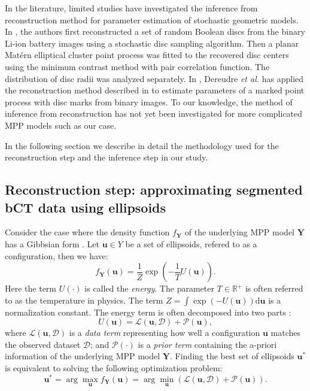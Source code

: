 \documentclass[journal]{IEEEtran}
\newcommand{\dd}[1]{\mathrm{d}#1}%
\begin{document}
In the literature, limited studies have investigated the inference
from reconstruction method for parameter estimation of stochastic
geometric models. In \cite{thiedmann2011stochastic}, the authors first
reconstructed a set of random Boolean discs from the binary Li-ion
battery images using a stochastic disc sampling algorithm. Then a
planar Mat\'ern elliptical cluster point process was fitted to the
recovered disc centers using the minimum contrast method with pair
correlation function. The distribution of disc radii was analyzed
separately. In \cite{dereudre2014estimation}, Dereudre \textit{et al.}
has applied the reconstruction method described in
\cite{thiedmann2011stochastic} to estimate parameters of a marked
point process with disc marks from binary images. To our knowledge,
the method of inference from reconstruction has not yet been
investigated for more complicated MPP models such as our case.

In the following section we describe in detail the methodology used
for the reconstruction step and the inference step in our study.

\subsection{Reconstruction step: approximating segmented bCT data
  using ellipsoids}
\label{sec:reconstr-step:-appr}

Consider the case where the density function $f_{\mathbf{Y}}$ of the
underlying MPP model $\mathbf{Y}$ has a Gibbsian form
\cite{moller2007modern}. Let $\mathbf{u} \in Y$ be a set of
ellipsoids, refered to as a configuration, then we have:
\begin{equation}
  \label{eq:gibbs-density}
  f_{\mathbf{Y}}(\mathbf{u}) = \frac{1}{Z} \exp \left( - \frac{1}{T}
    U(\mathbf{u}) \right).
\end{equation}
Here the term $U(\cdot)$ is called the \textit{energy}. The parameter
$T \in \mathbb{R}^{+}$ is often referred to as the temperature in
physics. The term
$Z = \int \exp \left( -U(\mathbf{u}) \right) \dd \mathbf{u}$ is a
normalization constant. The energy term is often decomposed into two
parts \cite{lafarge2010geometric} \cite{descombes2009object}:
\begin{equation}
  \label{mpp-energy}
  U(\mathbf{u}) = \mathcal{L}(\mathbf{u}, \mathcal{D})
  + \mathcal{P} (\mathbf{u}),
\end{equation}
where $\mathcal{L}(\mathbf{u}, \mathcal{D})$ is a \textit {data term}
representing how well a configuration $\mathbf{u}$ matches the
observed dataset $\mathcal{D}$; and $\mathcal{P} (\cdot)$ is a \textit
{prior term} containing the a-priori information of the underlying MPP
model $\mathbf{Y}$. Finding the best set of ellipsoids
$\mathbf{u}^{*}$ is equivalent to solving the following optimization
problem:
\begin{equation}
  \label{mpp-opt-energy}
  \mathbf{u}^{*}
  = \arg \max_{\mathbf{u}}{f_{\mathbf{Y}}(\mathbf{u})}
  = \arg\min_ {\mathbf{u}} \left( \mathcal{L}(\mathbf{u},
    \mathcal{D}) + \mathcal{P} (\mathbf{u}) \right).
\end{equation}
\end{document}
